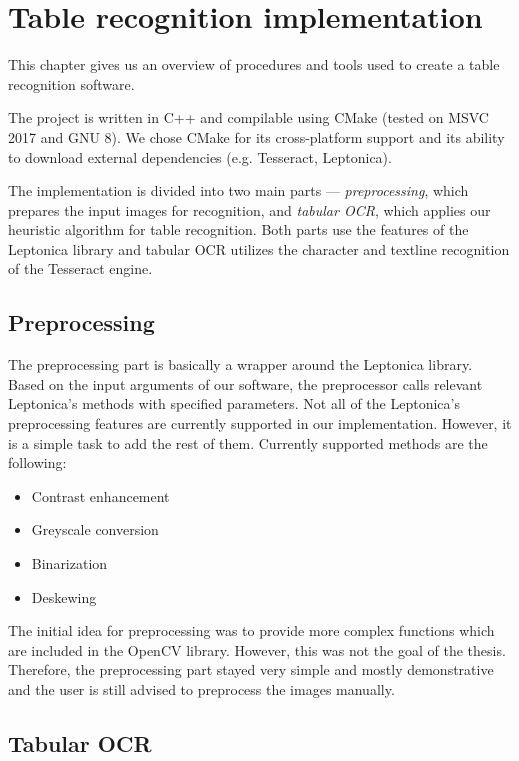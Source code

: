 \chapter{Table recognition implementation}

This chapter gives us an overview of procedures and tools used to create a table recognition software. 

The project is written in C++ and compilable using CMake (tested on MSVC 2017 and GNU 8). We chose CMake for its cross-platform support and its ability to download external dependencies (e.g. Tesseract, Leptonica). 

The implementation is divided into two main parts --- \emph{preprocessing}, which prepares the input images for recognition, and \emph{tabular OCR}, which applies our heuristic algorithm for table recognition. Both parts use the features of the Leptonica library and tabular OCR utilizes the character and textline recognition of the Tesseract engine.

\section{Preprocessing}

The preprocessing part is basically a wrapper around the Leptonica library. Based on the input arguments of our software, the preprocessor calls relevant Leptonica's methods with specified parameters. Not all of the Leptonica's preprocessing features are currently supported in our implementation. However, it is a simple task to add the rest of them. Currently supported methods are the following:

\begin{itemize}
    \item Contrast enhancement
    \item Greyscale conversion
    \item Binarization
    \item Deskewing
\end{itemize}

The initial idea for preprocessing was to provide more complex functions which are included in the OpenCV library. However, this was not the goal of the thesis. Therefore, the preprocessing part stayed very simple and mostly demonstrative and the user is still advised to preprocess the images manually.

\section{Tabular OCR}

